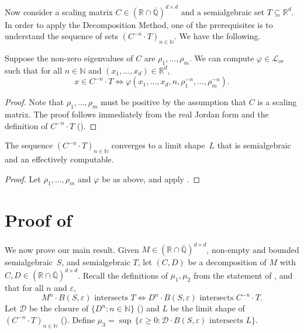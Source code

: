 \documentclass[a4paper,UKenglish,cleveref]{lipics-v2021}
\newcommand{\nat}{\mathbb{N}}
\newcommand{\rel}{\mathbb{R}}
\newcommand{\rat}{\mathbb{Q}}
\newcommand{\alg}{\overline{\rat}}
\newcommand{\ralg}{\rel \cap \alg}
\newcommand{\Dcal}{\mathcal{D}}
\newcommand{\Lcal}{\mathcal{L}}
\begin{document}
Now consider a scaling matrix $C \in (\ralg)^{d \times d}$ and a semialgebraic set $T \subseteq \rel^d$.
In order to apply the Decomposition Method, one of the prerequisites is to understand the sequence of sets $(C^{-n} \cdot T)_{n \in \nat}$.
We have the following.
\begin{lemma}
	\label{thm:defining-Zn}
	Suppose the non-zero eigenvalues of $C$ are $\rho_1,\ldots,\rho_m$.
	We can compute $\varphi \in\Lcal_{or}$ such that for all $n\in\nat $ and $(x_1,\ldots,x_d) \in \rel^d$,
	\[
	x \in C^{-n}\cdot T \Leftrightarrow \varphi(x_1,\ldots,x_d, n, \rho_1^{-n}, \ldots,  \rho_m^{-n}).
	\]
\end{lemma}
\begin{proof}
	Note that $\rho_1,\ldots,\rho_m$ must be positive by the assumption that $C$ is a scaling matrix.
	The proof follows immediately from the real Jordan form and the definition of $C^{-n} \cdot T$ ().
\end{proof}

\begin{lemma}
	\label{thm:scaling-matrices-lim-shape}
	The sequence $(C^{-n} \cdot T)_{n \in \nat}$ converges to a limit shape~$L$ that is semialgebraic and an effectively computable.
\end{lemma}
\begin{proof}
	Let $\rho_1,\ldots,\rho_m$ and $\varphi$ be as above, and apply .
\end{proof}

\section{Proof of \texorpdfstring{}{Theorem 1}}

We now prove our main result.
Given $M \in (\ralg)^{d\times d}$, non-empty and bounded semialgebraic~$S$, and semialgebraic $T$, let $(C,D)$ be a decomposition of $M$ with $C,D \in (\ralg)^{d\times d}$.
Recall the definitions of $\mu_1,\mu_2$ from the statement of , and that for all $n$ and $\varepsilon$, 
\[
M^n \cdot B(S, \varepsilon) \textrm{ intersects $T$} \Leftrightarrow D^n \cdot B(S, \varepsilon) \textrm{ intersects } C^{-n} \cdot T. 
\]
Let $\Dcal$ be the closure of $\{D^n \colon n \in \nat\}$ () and $L$ be the limit shape of $(C^{-n}\cdot T)_{n\in\nat}$ ().
Define $\mu_3 = \sup \, \{\varepsilon \ge 0 \colon \Dcal \cdot B(S,\varepsilon) \textrm{ intersects $L$}\}$.
\end{document}
